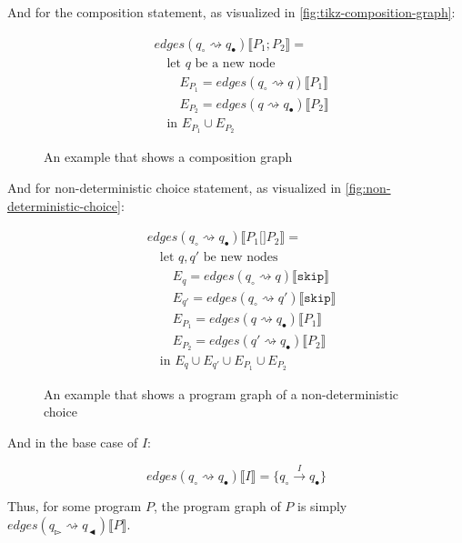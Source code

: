 And for the composition statement, as visualized in \autoref{fig:tikz-composition-graph}:

\begin{equation}
    \begin{split}
        &edges(q_\circ \rightsquigarrow q_\bullet) \lBrack P_1; P_2 \rBrack = \\
        &\quad \text{let } q \text{ be a new node} \\
        &\quad\quad E_{P_1} = edges(q_\circ \rightsquigarrow q) \lBrack P_1 \rBrack \\
        &\quad\quad E_{P_2} = edges(q \rightsquigarrow q_\bullet) \lBrack P_2 \rBrack \\
        &\quad \text{in } E_{P_1} \cup E_{P_2}
    \end{split}\label{eq:equation10}
\end{equation}


\begin{figure}
    \center
    
    \caption{An example that shows a composition graph}
    \label{fig:tikz-composition-graph}
\end{figure}


And for non-deterministic choice statement, as visualized in \autoref{fig:non-deterministic-choice}:


\begin{equation}
    \begin{split}
        &edges(q_\circ \rightsquigarrow q_\bullet) \lBrack P_1 \texttt{[]} P_2 \rBrack = \\
        &\quad \text{let } q, q' \text{ be new nodes} \\
        &\quad\quad E_{q} = edges(q_\circ \rightsquigarrow q) \lBrack \texttt{skip} \rBrack \\
        &\quad\quad E_{q'} = edges(q_\circ \rightsquigarrow q') \lBrack \texttt{skip} \rBrack \\
        &\quad\quad E_{P_1}= edges(q \rightsquigarrow q_\bullet) \lBrack P_1 \rBrack \\
        &\quad\quad E_{P_2}= edges(q' \rightsquigarrow q_\bullet) \lBrack P_2 \rBrack \\
        &\quad \text{in } E_{q} \cup E_{q'} \cup E_{P_1} \cup E_{P_2}
    \end{split}\label{eq:equation13}
\end{equation}

\begin{figure}[htb!]
    \center
    
    \caption{An example that shows a program graph of a non-deterministic choice}
    \label{fig:non-deterministic-choice}
\end{figure}

And in the base case of $I$:

\begin{equation*}
    edges(q_\circ \rightsquigarrow q_\bullet) \lBrack I \rBrack = \{q_\circ \xrightarrow{I} q_\bullet\}\label{eq:equation11}
\end{equation*}

Thus, for some program $P$, the program graph of $P$ is simply $edges(q_\whitepointerright \rightsquigarrow q_\blackpointerleft)\lBrack P \rBrack$.
